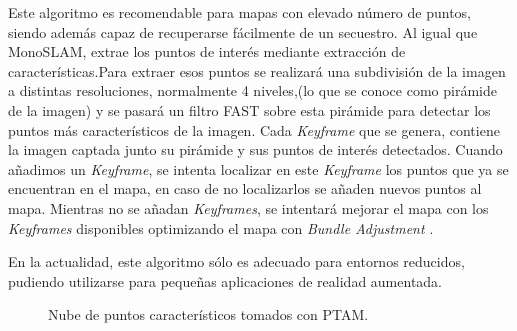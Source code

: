Este algoritmo es recomendable para mapas con elevado número de puntos, siendo además capaz de recuperarse fácilmente de un secuestro. Al igual que MonoSLAM, extrae los puntos de interés mediante extracción de características.Para extraer esos puntos se realizará una subdivisión de la imagen a distintas resoluciones, normalmente 4 niveles,(lo que se conoce como pirámide de la imagen) y se pasará un filtro FAST sobre esta pirámide para detectar los puntos más característicos de la imagen.
Cada \textit{Keyframe} que se genera, contiene  la imagen captada junto su pirámide y sus puntos de interés detectados. Cuando añadimos un \textit{Keyframe}, se intenta localizar en este \textit{Keyframe} los puntos que ya se encuentran en el mapa, en caso de no localizarlos se añaden nuevos puntos al mapa. Mientras no se añadan \textit{Keyframes}, se intentará mejorar el mapa con los \textit{Keyframes} disponibles optimizando el mapa con \textit{Bundle Adjustment \cite{BundleAdjust08}}.

En la actualidad, este algoritmo sólo es adecuado para entornos reducidos, pudiendo utilizarse para pequeñas aplicaciones de realidad aumentada.

\begin{figure}[H]
\begin{center}
\end{center}
\caption{Nube de puntos característicos tomados con PTAM.}
\end{figure}



\clearpage

